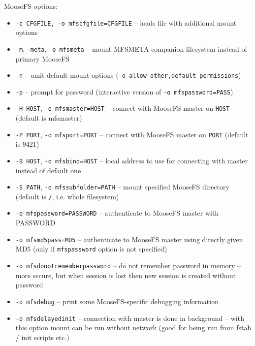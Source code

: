 \documentclass[a4paper,11pt,english]{report}
\def\code#1{\texttt{#1}}
\begin{document}
				MooseFS options:
				\begin{itemize}
					\item \code{-c CFGFILE, -o mfscfgfile=CFGFILE}
						-- loads file with additional mount options

					\item \code{-m}, \code{--meta}, \code{-o mfsmeta}
						-- mount MFSMETA companion filesystem instead of primary MooseFS

					\item \code{-n}
						-- omit default mount options (\code{-o allow\_other,default\_permissions})

					\item \code{-p}
						-- prompt for password (interactive version of \code{-o mfspassword=PASS})

					\item \code{-H HOST}, \code{-o mfsmaster=HOST}
						-- connect with MooseFS master on \code{HOST} (default is mfsmaster)

					\item \code{-P PORT}, \code{-o mfsport=PORT}
						-- connect with MooseFS master on \code{PORT} (default is 9421)

					\item \code{-B HOST}, \code{-o mfsbind=HOST}
						-- local address to use  for  connecting  with  master  instead  of
						default one

					\item \code{-S PATH}, \code{-o mfssubfolder=PATH}
						-- mount  specified  MooseFS  directory  (default  is \code{/}, i.e. whole
						filesystem)

					\item \code{-o mfspassword=PASSWORD}
						-- authenticate to MooseFS master with PASSWORD

					\item \code{-o mfsmd5pass=MD5}
						-- authenticate to MooseFS master using directly given MD5 (only if
						\code{mfspassword} option is not specified)
					
					\item \code{-o mfsdonotrememberpassword}
						-- do not remember password in memory -- more secure, but when session is lost then new session is created without password

					\item \code{-o mfsdebug}
						-- print some MooseFS-specific debugging information

					\item \code{-o mfsdelayedinit}
						-- connection with master is done in background -- with this option mount can be run without network (good for being run from fstab / init scripts etc.)


\end{itemize}
\end{document}
